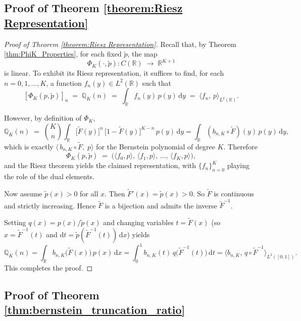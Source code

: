 \documentclass{article}
\begin{document}
\subsection{Proof of Theorem \ref{theorem:Riesz Representation}}
\begin{proof}[Proof of Theorem \ref{theorem:Riesz Representation}]
  Recall that, by Theorem \ref{thm:PhiK_Properties}, for each fixed $\tilde p$, the map
  \[
    \Phi_K(\cdot,\tilde p):C(\mathbb{R})\;\longrightarrow\;\mathbb{R}^{K+1}
  \]
  is linear.  To exhibit its Riesz representation, it suffices to find, for each $n=0,1,\dots,K$, a function $f_n(y)\in L^{2}(\mathbb{R})$ such that
  \[
    [\Phi_K(p,\tilde p)]_n
    \;=\;
    \mathbb{Q}_K(n)
    \;=\;
    \int_{\mathbb{R}} f_n(y)\,p(y)\,\mathrm{d}y
    \;=\;
    \bigl\langle f_n,\,p\bigr\rangle_{L^2(\mathbb{R})}.
  \]

  However, by definition of $\Phi_K$,
  \[
    \mathbb{Q}_K(n)
    \;=\;
    \binom{K}{n}
    \int_{\mathbb{R}}
      \bigl[\tilde F(y)\bigr]^n\,\bigl[1-\tilde F(y)\bigr]^{K-n}
      \,p(y)\,\mathrm{d}y=\int_{\mathbb{R}}\left(b_{n,K}\circ \tilde{F}\right)(y)\,p(y)\,\mathrm{d}y,
  \]
  which is exactly $\langle\,b_{n,K}\circ\tilde F,\;p\rangle$ for the Bernstein polynomial of degree $K$. Therefore
  \[
    \Phi_K(p,\tilde p)
    \;=\;
    \bigl(
      \langle f_0,p\rangle,\,
      \langle f_1,p\rangle,\,
      \dots,\,
      \langle f_K,p\rangle
    \bigr),
  \]
  and the Riesz theorem yields the claimed representation, with
  \(\{f_n\}_{n=0}^K\) playing the role of the dual elements.

  \medskip\noindent
  Now assume $\tilde p(x)>0$ for all $x$.  Then $\tilde F'(x)=\tilde p(x)>0$. So $\tilde F$ is continuous and strictly increasing.  Hence $\tilde F$ is a bijection and admits the inverse $\tilde F^{-1}$.

  Setting $q(x)=p(x)/\tilde p(x)$ and changing variables $t=\tilde F(x)$ (so $x=\tilde F^{-1}(t)$ and $\mathrm{d} t=\tilde p(\tilde F^{-1}(t))\,\mathrm{d} x$) yields
  \[
    \mathbb{Q}_K(n)
    = \int_{\mathbb{R}} b_{n,K}\bigl(\tilde F(x)\bigr)\,p(x)\,\mathrm{d} x
    = \int_{0}^{1} b_{n,K}(t)\,q\bigl(\tilde F^{-1}(t)\bigr)\,\mathrm{d} t
    = \bigl\langle b_{n,K},\,q\circ\tilde F^{-1}\bigr\rangle_{L^2([0,1])}.
  \]
  This completes the proof.
\end{proof}

\subsection{Proof of Theorem \ref{thm:bernstein_truncation_ratio}}
\end{document}
